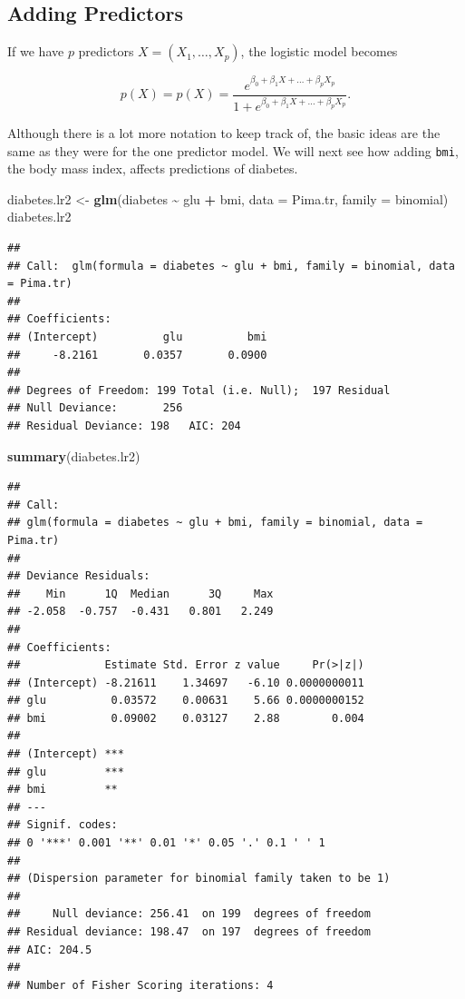 \documentclass[
]{krantz}
\newenvironment{Shaded}{\begin{snugshade}}{\end{snugshade}}
\newcommand{\DataTypeTok}[1]{\textcolor[rgb]{0.13,0.29,0.53}{#1}}
\newcommand{\KeywordTok}[1]{\textcolor[rgb]{0.13,0.29,0.53}{\textbf{#1}}}
\newcommand{\NormalTok}[1]{#1}
\newcommand{\OperatorTok}[1]{\textcolor[rgb]{0.81,0.36,0.00}{\textbf{#1}}}
\newcommand{\StringTok}[1]{\textcolor[rgb]{0.31,0.60,0.02}{#1}}
\begin{document}
\hypertarget{adding-predictors}{%
\subsection{Adding Predictors}\label{adding-predictors}}

If we have \(p\) predictors \(X = (X_1, \dots, X_p)\), the logistic model becomes

\[
p(X) = p(X) = \frac{e^{\beta_0 + \beta_1 X + \dots + \beta_p X_p}}{1 + e^{\beta_0 + \beta_1 X + \dots + \beta_p X_p}}.
\]

Although there is a lot more notation to keep track of, the basic ideas are the same as they were for the one predictor model. We will next see how adding \texttt{bmi}, the body mass index, affects predictions of diabetes.

\begin{Shaded}
\begin{Highlighting}[]
\NormalTok{diabetes.lr2 \textless{}{-}}\StringTok{ }\KeywordTok{glm}\NormalTok{(diabetes }\OperatorTok{\textasciitilde{}}\StringTok{ }\NormalTok{glu }\OperatorTok{+}\StringTok{ }\NormalTok{bmi, }
                    \DataTypeTok{data =}\NormalTok{ Pima.tr, }\DataTypeTok{family =}\NormalTok{ binomial)}
\NormalTok{diabetes.lr2}
\end{Highlighting}
\end{Shaded}

\begin{verbatim}
## 
## Call:  glm(formula = diabetes ~ glu + bmi, family = binomial, data = Pima.tr)
## 
## Coefficients:
## (Intercept)          glu          bmi  
##     -8.2161       0.0357       0.0900  
## 
## Degrees of Freedom: 199 Total (i.e. Null);  197 Residual
## Null Deviance:       256 
## Residual Deviance: 198   AIC: 204
\end{verbatim}

\begin{Shaded}
\begin{Highlighting}[]
\KeywordTok{summary}\NormalTok{(diabetes.lr2)}
\end{Highlighting}
\end{Shaded}

\begin{verbatim}
## 
## Call:
## glm(formula = diabetes ~ glu + bmi, family = binomial, data = Pima.tr)
## 
## Deviance Residuals: 
##    Min      1Q  Median      3Q     Max  
## -2.058  -0.757  -0.431   0.801   2.249  
## 
## Coefficients:
##             Estimate Std. Error z value     Pr(>|z|)
## (Intercept) -8.21611    1.34697   -6.10 0.0000000011
## glu          0.03572    0.00631    5.66 0.0000000152
## bmi          0.09002    0.03127    2.88        0.004
##                
## (Intercept) ***
## glu         ***
## bmi         ** 
## ---
## Signif. codes:  
## 0 '***' 0.001 '**' 0.01 '*' 0.05 '.' 0.1 ' ' 1
## 
## (Dispersion parameter for binomial family taken to be 1)
## 
##     Null deviance: 256.41  on 199  degrees of freedom
## Residual deviance: 198.47  on 197  degrees of freedom
## AIC: 204.5
## 
## Number of Fisher Scoring iterations: 4
\end{verbatim}
\end{document}
